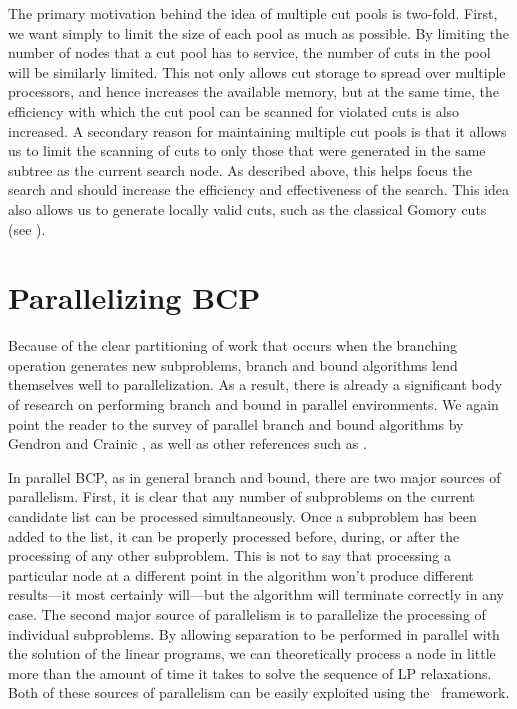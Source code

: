 The primary motivation behind the idea of multiple cut pools is
two-fold. First, we want simply to limit the size of each pool as
much as possible. By limiting the number of nodes that a cut pool has
to service, the number of cuts in the pool will be similarly limited.
This not only allows cut storage to spread over multiple processors,
and hence increases the available memory, but at the same time, the
efficiency with which the cut pool can be scanned for violated cuts is
also increased. A secondary reason for maintaining multiple cut pools is
that it allows us to limit the scanning of cuts to only those that
were generated in the same subtree as the current search node. As
described above, this helps focus the search and should increase the
efficiency and effectiveness of the search. This idea also
allows us to generate locally valid cuts, such as the classical
Gomory cuts (see \cite{nemwol88}).

\section{Parallelizing BCP}
\label{parallelizing}

Because of the clear partitioning of work that occurs when the
branching operation generates new subproblems, branch and bound
algorithms lend themselves well to parallelization. As a result, there
is already a significant body of research on performing branch and
bound in parallel environments. We again point the reader to the
survey of parallel branch and bound algorithms by Gendron and Crainic
\cite{gend:paral}, as well as other references such as
\cite{PICO,GraKum99,kuma:para4,kuma:para3}.

In parallel BCP, as in general branch and bound, there are two major
sources of parallelism. First, it is clear that any number of
subproblems on the current candidate list can be processed
simultaneously. Once a subproblem has been added to the list, it can
be properly processed before, during, or after the processing of any
other subproblem. This is not to say that processing a particular node
at a different point in the algorithm won't produce different
results---it most certainly will---but the algorithm will terminate
correctly in any case. The second major source of parallelism is to
parallelize the processing of individual subproblems. By allowing
separation to be performed in parallel with the solution of the linear
programs, we can theoretically process a node in little more than the
amount of time it takes to solve the sequence of LP relaxations. Both
of these sources of parallelism can be easily exploited using the
\BB\ framework.

